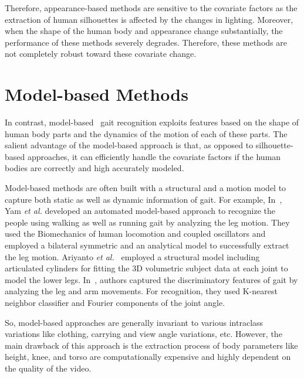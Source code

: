 Therefore, appearance-based methods are sensitive to the covariate factors as the extraction of human silhouettes is affected by the changes in lighting. Moreover, when the shape of the human body and appearance change substantially, the performance of these methods severely degrades. Therefore, these methods are not completely robust toward these covariate change.



\section{Model-based Methods} \label{sec:model_based_methods}
In contrast, model-based~\cite{Yam_04, Ariyanto_11, Tafazzoli_10, Feng_16} gait recognition exploits features based on the shape of human body parts and the dynamics of the motion of each of these parts. The salient advantage of the model-based approach is that, as  opposed to silhouette-based approaches, it can efficiently handle the covariate factors if the human bodies are correctly and high accurately modeled.

Model-based methods are often built with a structural and a motion model to capture both static as well as dynamic information of gait. For example, In~\cite{Yam_04}, Yam \textit{et al.} developed an automated model-based approach to recognize the people using walking as well as running gait by analyzing the leg motion. They used the Biomechanics of human locomotion and coupled oscillators and employed a bilateral symmetric and an analytical model to successfully extract the leg motion. Ariyanto \textit{et al.}~\cite{Ariyanto_11} employed a structural model including articulated cylinders for fitting the 3D volumetric subject data at each joint to model the lower legs. In~\cite{Tafazzoli_10}, authors captured the discriminatory features of gait by analyzing the leg and arm movements. For recognition, they used K-nearest neighbor classifier and Fourier components of the joint angle. 

So, model-based approaches are generally invariant to various intraclass variations like clothing, carrying and view angle variations, etc. However, the main drawback of this approach is the extraction process of body parameters like height, knee, and torso are computationally expensive and highly dependent on the quality of the video.


